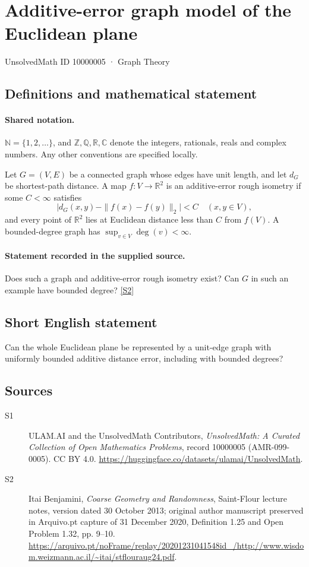 \documentclass[11pt]{article}
\newcommand{\sref}[2]{\hyperlink{source:#1:#2}{[S#2]}}
\begin{document}
\setcounter{section}{10000004}
\section{Additive-error graph model of the Euclidean plane}\label{10000005}
{\small\sffamily UnsolvedMath ID 10000005 · Graph Theory}
\subsection{Definitions and mathematical statement}

\paragraph{Shared notation.}$\mathbb N=\{1,2,\ldots\}$, and $\mathbb Z,\mathbb Q,\mathbb R,\mathbb C$ denote the integers, rationals, reals and complex numbers. Any other conventions are specified locally.


Let $G=(V,E)$ be a connected graph whose edges have unit length, and let $d_G$ be shortest-path distance. A map $f:V\to\mathbb R^2$ is an additive-error rough isometry if some $C<\infty$ satisfies
\[\bigl|d_G(x,y)-\|f(x)-f(y)\|_2\bigr|<C\quad(x,y\in V),\]
and every point of $\mathbb R^2$ lies at Euclidean distance less than $C$ from $f(V)$. A bounded-degree graph has $\sup_{v\in V}\deg(v)<\infty$.
\paragraph{Statement recorded in the supplied source.}
Does such a graph and additive-error rough isometry exist? Can $G$ in such an example have bounded degree? \sref{10000005}{2}
\subsection{Short English statement}
Can the whole Euclidean plane be represented by a unit-edge graph with uniformly bounded additive distance error, including with bounded degrees?
\subsection{Sources}
\begin{description}
\item[\hypertarget{source:10000005:1}{S1}] ULAM.AI and the UnsolvedMath Contributors, \emph{UnsolvedMath: A Curated Collection of Open Mathematics Problems}, record 10000005 (AMR-099-0005). CC BY 4.0. \url{https://huggingface.co/datasets/ulamai/UnsolvedMath}.
\item[\hypertarget{source:10000005:2}{S2}] Itai Benjamini, \emph{Coarse Geometry and Randomness}, Saint-Flour lecture notes, version dated 30 October 2013; original author manuscript preserved in Arquivo.pt capture of 31 December 2020, Definition 1.25 and Open Problem 1.32, pp. 9--10. \url{https://arquivo.pt/noFrame/replay/20201231041548id_/http://www.wisdom.weizmann.ac.il/~itai/stflouraug24.pdf}.
\end{description}
\label{end:10000005}
\end{document}
